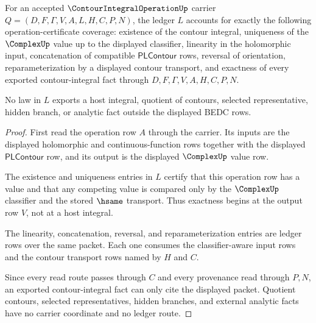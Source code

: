 \begin{theorem}
\label{thm:contour-integral-operation-contour-laws-ledger}
For an accepted $\ContourIntegralOperationUp$ carrier $Q=(D,F,\Gamma,V,A,L,H,C,P,N)$, the ledger $L$ accounts for exactly the following operation-certificate coverage: existence of the contour integral, uniqueness of the $\ComplexUp$ value up to the displayed classifier, linearity in the holomorphic input, concatenation of compatible $\mathsf{PLContour}$ rows, reversal of orientation, reparameterization by a displayed contour transport, and exactness of every exported contour-integral fact through $D,F,\Gamma,V,A,H,C,P,N$.

No law in $L$ exports a host integral, quotient of contours, selected representative, hidden branch, or analytic fact outside the displayed BEDC rows.
\end{theorem}
\begin{proof}
First read the operation row $A$ through the carrier. Its inputs are the displayed holomorphic and continuous-function rows together with the displayed $\mathsf{PLContour}$ row, and its output is the displayed $\ComplexUp$ value row.

The existence and uniqueness entries in $L$ certify that this operation row has a value and that any competing value is compared only by the $\ComplexUp$ classifier and the stored $\hsame$ transport. Thus exactness begins at the output row $V$, not at a host integral.

The linearity, concatenation, reversal, and reparameterization entries are ledger rows over the same packet. Each one consumes the classifier-aware input rows and the contour transport rows named by $H$ and $C$.

Since every read route passes through $C$ and every provenance read through $P,N$, an exported contour-integral fact can only cite the displayed packet. Quotient contours, selected representatives, hidden branches, and external analytic facts have no carrier coordinate and no ledger route.
\end{proof}


